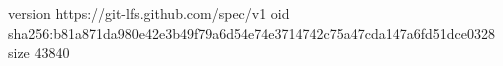 version https://git-lfs.github.com/spec/v1
oid sha256:b81a871da980e42e3b49f79a6d54e74e3714742c75a47cda147a6fd51dce0328
size 43840
